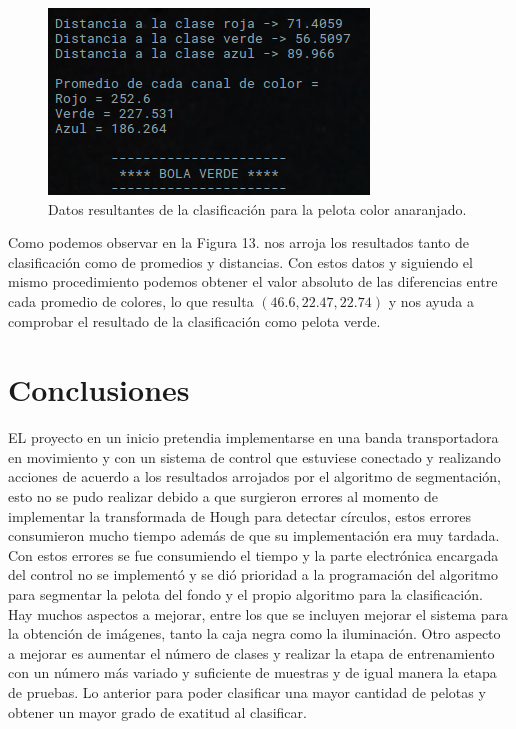 \documentclass[conference]{IEEEtran}
\begin{document}
\begin{figure}[h]
	\setlength{\unitlength}{0.0105in}
	\centering
	\includegraphics[scale=0.41]{./images/Console3.png}
	\caption{ Datos resultantes de la clasificaci\'on para la pelota color anaranjado. }
\end{figure}

Como podemos observar en la Figura 13. nos arroja los resultados tanto de clasificaci\'on como de promedios y distancias. Con estos datos y siguiendo el mismo procedimiento podemos obtener el valor absoluto de las diferencias entre cada promedio de colores, lo que resulta $(46.6, 22.47, 22.74)$ y nos ayuda a comprobar el resultado de la clasificaci\'on como pelota verde.

\newpage
\section{Conclusiones}
EL proyecto en un inicio pretendia implementarse en una banda transportadora en movimiento y con un sistema de control que estuviese conectado y realizando acciones de acuerdo a los resultados arrojados por el algoritmo de segmentaci\'on, esto no se pudo realizar debido a que surgieron errores al momento de implementar la transformada de Hough para detectar c\'irculos, estos errores consumieron mucho tiempo adem\'as de que su implementaci\'on era muy tardada. Con estos errores se fue consumiendo el tiempo y la parte electr\'onica encargada del control no se implement\'o y se di\'o prioridad a la programaci\'on del algoritmo para segmentar la pelota del fondo y el propio algoritmo para la clasificaci\'on.\\

Hay muchos aspectos a mejorar, entre los que se incluyen mejorar el sistema para la obtenci\'on de im\'agenes, tanto la caja negra como la iluminaci\'on. Otro aspecto a mejorar es aumentar el n\'umero de clases y realizar la etapa de entrenamiento con un n\'umero m\'as variado y suficiente de muestras y de igual manera la etapa de pruebas. Lo anterior para poder clasificar una mayor cantidad de pelotas y obtener un mayor grado de exatitud al clasificar.\\
\end{document}
